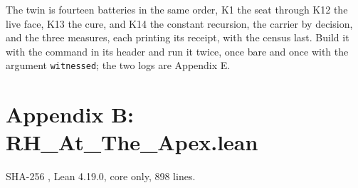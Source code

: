 \documentclass[10pt,twocolumn]{article}
\begin{document}
The twin is fourteen batteries in the same order, K1 the seat through
K12 the live face, K13 the cure, and K14 the constant recursion, the
carrier by decision, and the three measures, each printing its receipt,
with the census last. Build it with the command in its header and run it
twice, once bare and once with the argument \texttt{witnessed}; the two
logs are Appendix E.

\hypertarget{appendix-b-rh_at_the_apex.lean}{%
\section{Appendix B:
RH\_At\_The\_Apex.lean}\label{appendix-b-rh_at_the_apex.lean}}

SHA-256
\texttt{},
Lean 4.19.0, core only, 898 lines.

\begingroup\scriptsize
\end{document}
